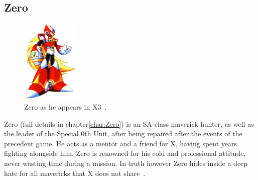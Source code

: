 \subsection{Zero}
\begin{figure}[htp]
	\centering
	\includegraphics[height=4cm]{figures/X3/Zero.png}
	\caption{Zero as he appears in X3~\cite{book:MMX_Complete_art}.}
\end{figure}
Zero (full details in chapter\ref{char:Zero}) is an SA-class maverick hunter, as well as the leader of the Special 0th Unit, after being repaired after the events of the precedent game. He acts as a mentor and a friend for X, having spent years fighting alongside him. Zero is renowned for his cold and professional attitude, never wasting time during a mission. In truth however Zero hides inside a deep hate for all mavericks that X does not share~\cite{Xcoll1:Manual_X3}.

